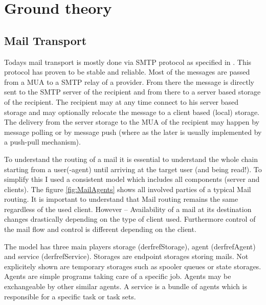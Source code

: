 \chapter{Ground theory}
\section{Mail Transport}\label{sec:mailTransport}
Todays mail transport is mostly done via SMTP protocol as specified in \cite{RFC5321}. This protocol has proven to be stable and reliable. Most of the messages are passed from a MUA to a SMTP relay of a provider. From there the message is directly sent to the SMTP server of the recipient and from there to a server based storage of the recipient. The recipient may at any time connect to his server based storage and may optionally relocate the message to a client based (local) storage. The delivery from the server storage to the MUA of the recipient may happen by message polling or by message push (where as the later is usually implemented by a push-pull mechanism).\par

To understand the routing of a mail it is essential to understand the whole chain starting from a user(-agent) until arriving at the target user (and being read!). To simplify this I used a consistent model which includes all components (server and clients). The figure \ref{fig:MailAgents} shows all involved parties of a typical Mail routing. It is important to understand that Mail routing remains the same regardless of the used client. However -- Availability of a mail at its destination changes drastically depending on the type of client used. Furthermore control of the mail flow and control is different depending on the client.\par

The model has three main players storage (derfref{Storage}), agent (derfref{Agent}) and service (derfref{Service}). Storages are endpoint storages storing mails. Not explicitely shown are temporary storages such as spooler queues or state storages. Agents are simple programs taking care of a specific job. Agents may be exchangeable by other similar agents. A service is a bundle of agents which is responsible for a specific task or task sets.

